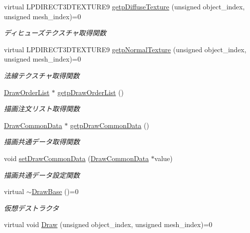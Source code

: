 \begin{DoxyCompactItemize}
virtual L\+P\+D\+I\+R\+E\+C\+T3\+D\+T\+E\+X\+T\+U\+R\+E9 \mbox{\hyperlink{class_draw_base_a96e94272903d6b663463e0f49246d959}{getp\+Diffuse\+Texture}} (unsigned object\+\_\+index, unsigned mesh\+\_\+index)=0
\begin{DoxyCompactList}\small\item\em ディヒューズテクスチャ取得関数 \end{DoxyCompactList}\item 
virtual L\+P\+D\+I\+R\+E\+C\+T3\+D\+T\+E\+X\+T\+U\+R\+E9 \mbox{\hyperlink{class_draw_base_a76c3b910b495fcf69aacf6164ca90c7d}{getp\+Normal\+Texture}} (unsigned object\+\_\+index, unsigned mesh\+\_\+index)=0
\begin{DoxyCompactList}\small\item\em 法線テクスチャ取得関数 \end{DoxyCompactList}\item 
\mbox{\hyperlink{class_draw_order_list}{Draw\+Order\+List}} $\ast$ \mbox{\hyperlink{class_draw_base_af5fe522d4bbce381e6fe8e5601b69e9f}{getp\+Draw\+Order\+List}} ()
\begin{DoxyCompactList}\small\item\em 描画注文リスト取得関数 \end{DoxyCompactList}\item 
\mbox{\hyperlink{class_draw_common_data}{Draw\+Common\+Data}} $\ast$ \mbox{\hyperlink{class_draw_base_ac55a0cbcb51067ec9a3515530bb3f7de}{getp\+Draw\+Common\+Data}} ()
\begin{DoxyCompactList}\small\item\em 描画共通データ取得関数 \end{DoxyCompactList}\item 
void \mbox{\hyperlink{class_draw_base_a75591fe15951811f294dc964a7894214}{set\+Draw\+Common\+Data}} (\mbox{\hyperlink{class_draw_common_data}{Draw\+Common\+Data}} $\ast$value)
\begin{DoxyCompactList}\small\item\em 描画共通データ設定関数 \end{DoxyCompactList}\item 
virtual \mbox{\hyperlink{class_draw_base_af276fa23e7c5f51a4fdeab016456a992}{$\sim$\+Draw\+Base}} ()=0
\begin{DoxyCompactList}\small\item\em 仮想デストラクタ \end{DoxyCompactList}\item 
virtual void \mbox{\hyperlink{class_draw_base_a408080106630a1146d7af0bb46a4d8d1}{Draw}} (unsigned object\+\_\+index, unsigned mesh\+\_\+index)=0

\end{DoxyCompactItemize}
